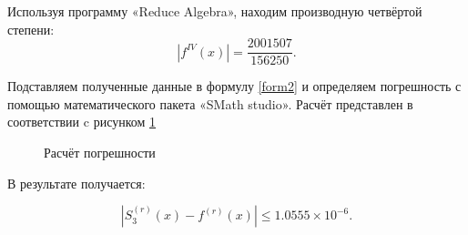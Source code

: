 \documentclass[russian,utf8,nocolumnxxxi,nocolumnxxxii]{eskdtext}
\begin{document}
Используя программу «Reduce Algebra», находим производную четвёртой степени:
\begin{equation}
\left | f^{IV}(x) \right |=\frac{2001507}{156250}.
\end{equation}

Подставляем полученные данные в формулу \ref{form2} и определяем погрешность с помощью математического  пакета  «SMath studio». Расчёт представлен в соответствии c рисунком \ref{kof3}

\begin{figure}[h!]
\begin{center}
\begin{minipage}[h]{0.3\linewidth}
\end{minipage}
\caption{Расчёт погрешности } \label{kof3}
\end{center}
\end{figure}

В результате получается:

\begin{equation}
\left | S_3^{(r)}(x) - f^{(r)}(x) \right | \leqslant 1.0555 \times 10^{-6}.
\end{equation}
\end{document}
